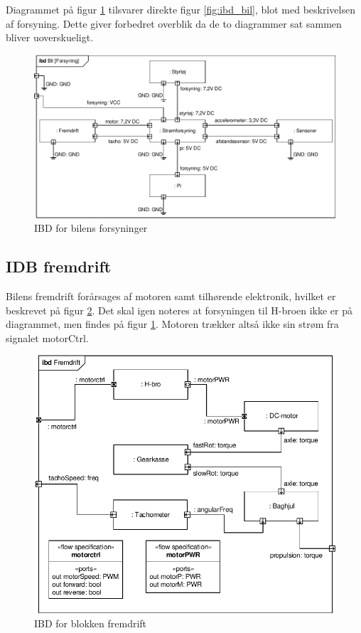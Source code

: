 Diagrammet på figur \ref{fig:ibd_bil_forsyning} tilsvarer direkte figur \ref{fig:ibd_bil}, blot med beskrivelsen af forsyning. Dette giver forbedret overblik da de to diagrammer sat sammen bliver uoverskueligt.  

\begin{figure}[h]
\centering
\includegraphics[scale=1]{../fig/diagrammer/bil/ibd_bil_forsyning.pdf}
\caption{IBD for bilens forsyninger}
\label{fig:ibd_bil_forsyning}
\end{figure}

\subsection{IDB fremdrift}

Bilens fremdrift forårsages af motoren samt tilhørende elektronik, hvilket er beskrevet på figur \ref{fig:ibd_fremdrift}. Det skal igen noteres at forsyningen til H-broen ikke er på diagrammet, men findes på figur \ref{fig:ibd_bil_forsyning}. Motoren trækker altså ikke sin strøm fra signalet motorCtrl. 

\begin{figure}[h]
\centering
\includegraphics[scale=1]{../fig/diagrammer/bil/ibd_fremdrift.pdf}
\caption{IBD for blokken fremdrift}
\label{fig:ibd_fremdrift}
\end{figure}

